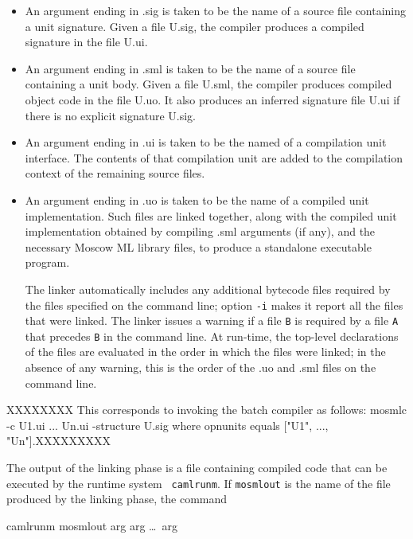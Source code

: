 \documentclass[fleqn]{article}
\begin{document}
\begin{itemize}
\item An argument ending in .sig is taken to be the name of a source
  file containing a unit signature.  Given a file U.sig, the compiler
  produces a compiled signature in the file U.ui.

\item An argument ending in .sml is taken to be the name of a source
  file containing a unit body.  Given a file U.sml, the compiler
  produces compiled object code in the file U.uo.  It also produces an
  inferred signature file U.ui if there is no explicit signature U.sig.
  
\item An argument ending in .ui is taken to be the named of a
  compilation unit interface.  The contents of that compilation unit
  are added to the compilation context of the remaining source files.
  
\item An argument ending in .uo is taken to be the name of a compiled
  unit implementation.  Such files are linked together, along with the
  compiled unit implementation obtained by compiling .sml arguments
  (if any), and the necessary Moscow ML library files, to produce a
  standalone executable program.
  
  The linker automatically includes any additional bytecode files
  required by the files specified on the command line; option {\tt -i}
  makes it report all the files that were linked.  The linker issues a
  warning if a file {\tt B} is required by a file {\tt A} that
  precedes {\tt B} in the command line.  At run-time, the top-level
  declarations of the files are evaluated in the order in which the
  files were linked; in the absence of any warning, this is the order
  of the .uo and .sml files on the command line.
\end{itemize}

\noindent 

XXXXXXXX This corresponds to
  invoking the batch compiler as follows: mosmlc -c U1.ui ... Un.ui
  -structure U.sig where opnunits equals ["U1", ..., "Un"].XXXXXXXXX

The output of the linking phase is a file containing
compiled code that can be executed by the runtime system {\tt
  camlrunm}.  If {\tt mosmlout} is the name of the file produced by the
linking phase, the command

\begin{program}
camlrunm mosmlout arg arg \ldots\ arg
\end{program}
\end{document}
